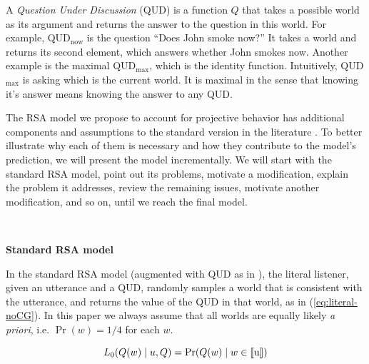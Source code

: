 A \emph{Question Under Discussion} (QUD) is a function $Q$ that takes a possible world as 
 its argument and returns the answer to the question in this world.
For example, QUD$_\textrm{now}$ is the question ``Does John smoke now?'' 
It takes a world and returns its second element, which answers whether 
 John smokes now. 
Another example is the maximal QUD$_\textrm{max}$, which is the identity function. 
Intuitively, QUD$_\textrm{max}$ is asking which is the current world.
It is maximal in the sense that knowing it's answer means knowing the answer to 
 any QUD.
 
The RSA model we propose to account for projective behavior has additional 
 components and assumptions to the standard version in the literature
 \cite{FrankGoodman2012:Predicting-Pragmatic-Reasoning-,GoodmanStuhlmuller2013:Knowledge-and-I,GoodmanLassiter2015-Chapter}.
To better illustrate why each of them is necessary and how they contribute to 
 the model's prediction, we will present the model incrementally. 
We will start with the standard RSA model, point out its problems, motivate 
 a modification, explain the problem it addresses, review the remaining issues, 
 motivate another modification, and so on, until we reach the final model.

\ 

\noindent\textbf{Standard RSA model}

In the standard RSA model (augmented with QUD as in ), the literal listener, given an utterance and a QUD, 
 randomly samples a world that is consistent with the utterance, 
 and returns the value of the QUD in that world, as in (\ref{eq:literal-noCG}). 
In this paper we always assume that all worlds are equally likely \emph{a priori}, 
 i.e. $\Pr(w)=1/4$ for each $w$.

\begin{equation}
L_0(Q(w) \mid u, Q) = \Pr(Q(w) \mid w \in \llbracket \text{u} \rrbracket) \label{eq:literal-noCG}
\end{equation}
 
 
